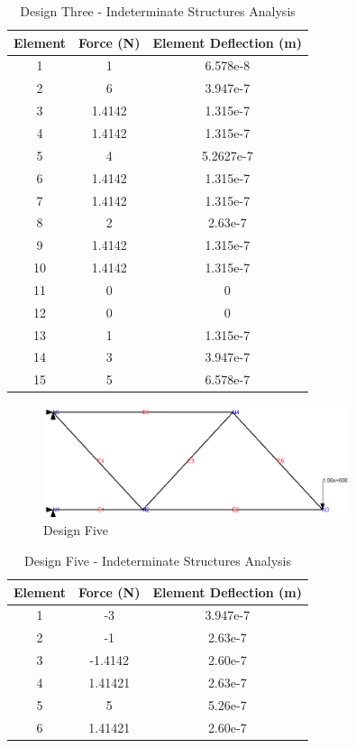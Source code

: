 \begin{table}[hp]
	\centering
	\caption{Design Three - Indeterminate Structures Analysis}
	\label{tbl:indeterm_3}
	\vspace{6pt}
	\begin{tabular}{ccc}
		\toprule
		Element & Force (N) & Element Deflection (m) \\
		\midrule
		1 & 1 & 6.578e-8 \\
		2 & 6 & 3.947e-7 \\ 
		3 & 1.4142  & 1.315e-7 \\ 
		4 & 1.4142  & 1.315e-7 \\ 
		5 & 4 & 5.2627e-7 \\ 
		6 & 1.4142  & 1.315e-7 \\ 
		7 & 1.4142 & 1.315e-7 \\ 
		8 & 2 & 2.63e-7 \\ 
		9 & 1.4142 & 1.315e-7 \\ 
		10 & 1.4142  & 1.315e-7 \\ 
		11 & 0 & 0 \\ 
		12 & 0  & 0 \\ 
		13 & 1  & 1.315e-7 \\ 
		14 & 3  & 3.947e-7 \\
		15 & 5 & 6.578e-7 \\
		\bottomrule
	\end{tabular}
\end{table}

\begin{figure}[p]
    \centering
    \includegraphics[width=0.8\textwidth]{images/truss5_given}
    \caption{Design Five}
    \label{fig:indeterm_5}
\end{figure}

\begin{table}[hp]
	\centering
	\caption{Design Five - Indeterminate Structures Analysis}
	\label{tbl:indeterm_5}
	\vspace{6pt}
	\begin{tabular}{ccc}
		\toprule
		Element & Force (N) & Element Deflection (m) \\
		\midrule
		1 &  -3 &  3.947e-7 \\
		2 &  -1 & 2.63e-7 \\
		3 &  -1.4142 &   2.60e-7 \\
		4 &  1.41421 &  2.63e-7 \\
		5 &  5 & 5.26e-7 \\
		6 &  1.41421 &  2.60e-7 \\ 
		\bottomrule
	\end{tabular}
\end{table}